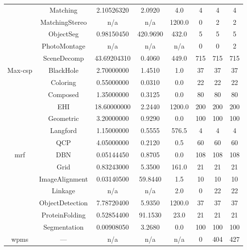 \begin{table}
\begin{tabular}{ccS[round-mode=places,round-precision=3]
					  S[round-mode=places,round-precision=0]
					  S[round-mode=places,round-precision=0]ccc}
				&	Matching	&	2.10526320	&	2.0920	&	4.0	&	4	&	4	&	4 \\
				&	MatchingStereo	&	{n/a}	&	{n/a}	&	1200.0	&	0	&	2	&	2 \\
				&	ObjectSeg	&	0.98150450	&	420.9690	&	432.0	&	5	&	5	&	5 \\
				&	PhotoMontage	&	{n/a}	&	{n/a}	&	{n/a}	&	0	&	0	&	2 \\
				&	SceneDecomp	&	43.69204310	&	0.4060	&	449.0	&	715	&	715	&	715 \\
			Max-\acrshort{csp}	&	BlackHole	&	2.70000000	&	1.4510	&	1.0	&	37	&	37	&	37 \\
				&	Coloring	&	0.55000000	&	0.0310	&	0.0	&	22	&	22	&	22 \\
				&	Composed	&	1.35000000	&	0.3125	&	0.0	&	80	&	80	&	80 \\
				&	EHI	&	18.60000000	&	2.2440	&	1200.0	&	200	&	200	&	200 \\
				&	Geometric	&	3.20000000	&	0.9290	&	0.0	&	100	&	100	&	100 \\
				&	Langford	&	1.15000000	&	0.5555	&	576.5	&	4	&	4	&	4 \\
				&	QCP	&	4.05000000	&	0.2120	&	0.5	&	60	&	60	&	60 \\
			\acrshort{mrf}	&	DBN	&	0.05144450	&	0.8705	&	0.0	&	108	&	108	&	108 \\
				&	Grid	&	0.83243000	&	5.3500	&	161.0	&	21	&	21	&	21 \\
				&	ImageAlignment	&	0.03140500	&	59.8440	&	1.5	&	10	&	10	&	10 \\
				&	Linkage	&	{n/a}	&	{n/a}	&	2.0	&	0	&	22	&	22 \\
				&	ObjectDetection	&	7.78720400	&	5.9350	&	1200.0	&	37	&	37	&	37 \\
				&	ProteinFolding	&	0.52854400	&	91.1530	&	23.0	&	21	&	21	&	21 \\
				&	Segmentation	&	0.00908050	&	3.2680	&	0.0	&	100	&	100	&	100 \\
			\acrshort{wpms}	&	---	&	{n/a}	&	{n/a}	&	{n/a}	&	0	&	404	&	427 \\
		\bottomrule
	\end{tabular}
\end{table}
